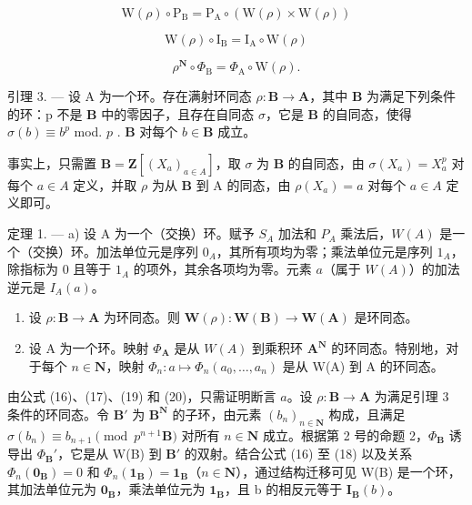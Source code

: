 \[
\mathrm{W} (\rho) \circ \mathrm{P} _ {\mathrm{B}} = \mathrm{P} _ {\mathrm{A}} \circ (\mathrm{W} (\rho) \times \mathrm{W} (\rho))\tag{21}
\]

\[
\mathrm{W} (\rho) \circ \mathrm{I} _ {\mathrm{B}} = \mathrm{I} _ {\mathrm{A}} \circ \mathrm{W} (\rho)\tag{22}
\]

\[
\rho^ {\mathbf {N}} \circ \Phi_ {\mathrm{B}} = \Phi_ {\mathrm{A}} \circ \mathrm{W} (\rho).
\]

 引理 3. --- 设 A 为一个环。存在满射环同态 \(\rho: \mathbf{B} \to \mathbf{A}\)，其中 \(\mathbf{B}\) 为满足下列条件的环：p 不是 \(\mathbf{B}\) 中的零因子，且存在自同态 \(\sigma\)，它是 \(\mathbf{B}\) 的自同态，使得 \(\sigma(b) \equiv b^p\) mod. \(p\) . \(\mathbf{B}\) 对每个 \(b \in \mathbf{B}\) 成立。

  事实上，只需置 \(\mathbf{B} = \mathbf{Z}[(X_{a})_{a \in A}]\)，取 \(\sigma\) 为 \(\mathbf{B}\) 的自同态，由 \(\sigma(X_{a}) = X_{a}^{p}\) 对每个 \(a \in A\) 定义，并取 \(\rho\) 为从 \(\mathbf{B}\) 到 A 的同态，由 \(\rho(X_{a}) = a\) 对每个 \(a \in A\) 定义即可。

定理 1. --- a) 设 A 为一个（交换）环。赋予 \(S_A\) 加法和 \(P_A\) 乘法后，\(W(A)\) 是一个（交换）环。加法单位元是序列 \(0_A\)，其所有项均为零；乘法单位元是序列 \(1_A\)，除指标为 0 且等于 \(1_A\) 的项外，其余各项均为零。元素 \(a\)（属于 \(W(A)\)）的加法逆元是 \(I_A(a)\)。

\begin{enumerate}
\def\labelenumi{\alph{enumi})}
\setcounter{enumi}{1}
\item
  设 \(\rho: \mathbf{B} \to \mathbf{A}\) 为环同态。则 \(\mathbf{W}(\rho): \mathbf{W}(\mathbf{B}) \to \mathbf{W}(\mathbf{A})\) 是环同态。
\item
  设 A 为一个环。映射 \(\Phi_{\mathbf{A}}\) 是从 \(W(A)\) 到乘积环 \(\mathbf{A}^{\mathbf{N}}\) 的环同态。特别地，对于每个 \(n \in \mathbf{N}\)，映射 \(\Phi_{n}: a \mapsto \Phi_{n}(a_{0}, \ldots, a_{n})\) 是从 W(A) 到 A 的环同态。
\end{enumerate}

  由公式 (16)、(17)、(19) 和 (20)，只需证明断言 \(a\)。设 \(\rho: \mathbf{B} \to \mathbf{A}\) 为满足引理 3 条件的环同态。令 \(\mathbf{B}'\) 为 \(\mathbf{B}^{\mathbf{N}}\) 的子环，由元素 \((b_n)_{n \in \mathbf{N}}\) 构成，且满足 \(\sigma(b_n) \equiv b_{n+1} \pmod{p^{n+1}\mathbf{B}}\) 对所有 \(n \in \mathbf{N}\) 成立。根据第 2 号的命题 2，\(\Phi_{\mathbf{B}}\) 诱导出 \(\Phi_{\mathbf{B}}'\)，它是从 W(B) 到 \(\mathbf{B}'\) 的双射。结合公式 (16) 至 (18) 以及关系 \(\Phi_n(\mathbf{0}_{\mathbf{B}}) = 0\) 和 \(\Phi_n(\mathbf{1}_{\mathbf{B}}) = \mathbf{1}_{\mathbf{B}}\)（\(n \in \mathbf{N}\)），通过结构迁移可见 W(B) 是一个环，其加法单位元为 \(\mathbf{0}_{\mathbf{B}}\)，乘法单位元为 \(\mathbf{1}_{\mathbf{B}}\)，且 b 的相反元等于 \(\mathbf{I}_{\mathbf{B}}(b)\)。

